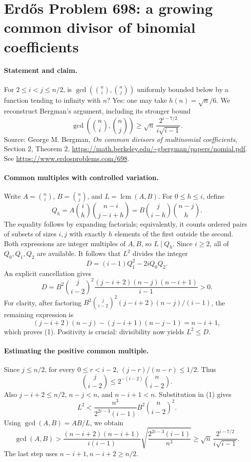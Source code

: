 \section*{Erd\H{o}s Problem 698: a growing common divisor of binomial coefficients}

\paragraph{Statement and claim.}
For \(2\leq i<j\leq n/2\), is
\(\gcd(\binom ni,\binom nj)\) uniformly bounded below by a
function tending to infinity with \(n\)?
Yes: one may take \(h(n)=\sqrt n/6\).
We reconstruct Bergman's argument, including its stronger bound
\[
 \gcd\left(\binom ni,\binom nj\right)
 \geq\sqrt n\,\frac{2^{i-7/2}}{i\sqrt{i-1}}.
\]
Source: George M. Bergman, \emph{On common divisors of multinomial
coefficients}, Section 2, Theorem 2,
\url{https://math.berkeley.edu/~gbergman/papers/nomial.pdf}.
See \url{https://www.erdosproblems.com/698}.

\paragraph{Common multiples with controlled variation.}
Write \(A=\binom ni\), \(B=\binom nj\), and \(L=\operatorname{lcm}(A,B)\).
For \(0\leq h\leq i\), define
\[
 Q_h=A\binom ih\binom{n-i}{j-i+h}
     =B\binom j{i-h}\binom{n-j}h.
\]
The equality follows by expanding factorials; equivalently, it
counts ordered pairs of subsets of sizes \(i,j\) with exactly
\(h\) elements of the first outside the second.
Both expressions are integer multiples of \(A,B\), so \(L\mid Q_h\).
Since \(i\geq2\), all of \(Q_0,Q_1,Q_2\) are available.
It follows that \(L^2\) divides the integer
\[
 D=(i-1)Q_1^2-2iQ_0Q_2.
\]
An explicit cancellation gives
\[
 D=B^2\binom j{i-2}^{\!2}
       \frac{(j-i+2)(n-j)(n-i+1)}{i-1}>0.                      \tag{1}
\]
For clarity, after factoring
\(B^2\binom j{i-2}^2(j-i+2)(n-j)/(i-1)\),
the remaining expression is
\[
 (j-i+2)(n-j)-(j-i+1)(n-j-1)=n-i+1,
\]
which proves (1). Positivity is crucial: divisibility now yields
\(L^2\leq D\).

\paragraph{Estimating the positive common multiple.}
Since \(j\leq n/2\), for every \(0\leq r<i-2\),
\((j-r)/(n-r)\leq1/2\). Thus
\[
 \binom j{i-2}\leq2^{-(i-2)}\binom n{i-2}.
\]
Also \(j-i+2\leq n/2\), \(n-j<n\), and \(n-i+1<n\).
Substitution in (1) gives
\[
 L^2<
 \frac{n^3}{2^{2i-3}(i-1)}
 B^2\binom n{i-2}^{\!2}.
\]
Using \(\gcd(A,B)=AB/L\), we obtain
\[
 \gcd(A,B)>
 \frac{(n-i+2)(n-i+1)}{i(i-1)}
 \sqrt{\frac{2^{2i-3}(i-1)}{n^3}}
 \geq\sqrt n\,\frac{2^{i-7/2}}{i\sqrt{i-1}}.
\]
The last step uses \(n-i+1,n-i+2\geq n/2\).

